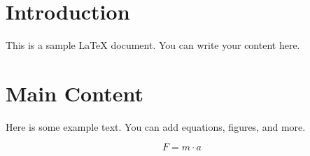 
\section{Introduction}

This is a sample LaTeX document. You can write your content here.

\section{Main Content}

Here is some example text. You can add equations, figures, and more.

\begin{equation} 
    F = m \cdot a
\end{equation}